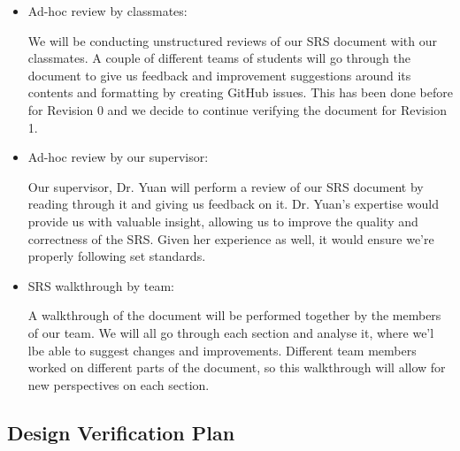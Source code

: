 \documentclass[12pt, titlepage]{article}
\begin{document}
\begin{itemize}
  \item Ad-hoc review by classmates:

      We will be conducting unstructured reviews of our SRS document with our classmates. A couple of different teams of students will go through the document to give us feedback and improvement suggestions around its contents and formatting by creating GitHub issues. This has been done before for Revision 0 and we decide to continue verifying the document for Revision 1.
  
  \item Ad-hoc review by our supervisor:

      Our supervisor, Dr. Yuan will perform a review of our SRS document by reading through it and giving us feedback on it. Dr. Yuan's expertise would provide us with valuable insight, allowing us to improve the quality and correctness of the SRS. Given her experience as well, it would ensure we're properly following set standards.

    \item SRS walkthrough by team:

      A walkthrough of the document will be performed together by the members of our team. We will all go through each section and analyse it, where we'l lbe able to suggest changes and improvements. Different team members worked on different parts of the document, so this walkthrough will allow for new perspectives on each section.

\end{itemize}

\subsection{Design Verification Plan}
\end{document}
